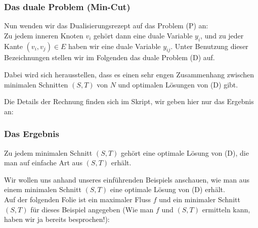\documentclass[smaller]{beamer}
\begin{document}
\begin{frame}
\frametitle{Das duale Problem (Min-Cut)}
Nun wenden wir das \alert{Dualisierungsrezept} auf das Problem (P) an: \\ \vspace*{0.2cm}
Zu jedem inneren Knoten $v_i$ gehört dann eine duale Variable $y_i$, und zu jeder Kante $(v_i,v_j) \in E$ haben wir eine duale Variable $y_{ij}$. Unter Benutzung dieser Bezeichnungen stellen wir im Folgenden das duale Problem (D) auf. \\ \vspace*{0.2cm}

Dabei wird sich herausstellen, dass es einen sehr engen Zusammenhang zwischen minimalen Schnitten $(S,T)$ von $N$ und optimalen Lösungen von (D) gibt. \\ \vspace*{0.2cm}

Die Details der Rechnung finden sich im Skript, wir geben hier nur das \alert{Ergebnis} an:
\end{frame}

\begin{frame}
\frametitle{Das Ergebnis}
\begin{center}
 \alert{Zu jedem minimalen Schnitt $(S,T)$ gehört eine optimale Lösung von (D), die man auf einfache Art aus $(S,T)$ erhält.}
\end{center}
Wir wollen uns anhand unseres einführenden Beispiels anschauen, wie
man aus einem minimalen Schnitt $(S,T)$ eine optimale Lösung von (D) erhält. \\ \vspace*{0.2cm}
Auf der folgenden Folie ist ein maximaler Fluss $f$ und ein minimaler Schnitt
$(S, T)$ für dieses Beispiel angegeben (Wie man $f$ und $(S,T)$ ermitteln kann,
haben wir ja bereits besprochen!):
\end{frame}
\end{document}
